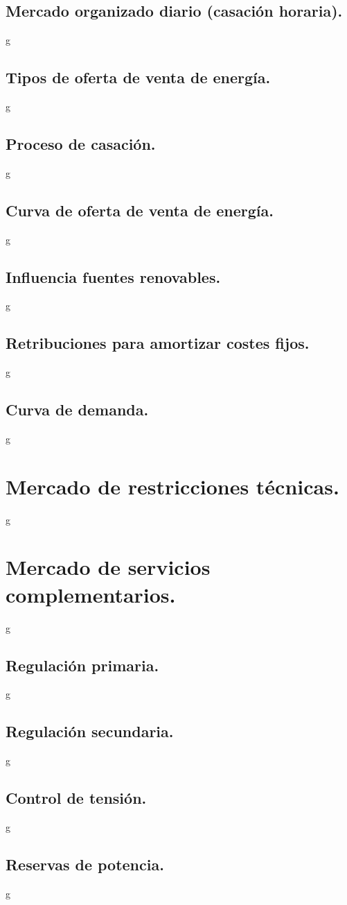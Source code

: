 \subsection{Mercado organizado diario (casación horaria).}
g
\subsection{Tipos de oferta de venta de energía.}
g
\subsection{Proceso de casación.}
g
\subsection{Curva de oferta de venta de energía.}
g
\subsection{Influencia fuentes renovables.}
g
\subsection{Retribuciones para amortizar costes fijos.}
g
\subsection{Curva de demanda.}
g
\section{Mercado de restricciones técnicas.}
g
\section{Mercado de servicios complementarios.}
g
\subsection{Regulación primaria.}
g
\subsection{Regulación secundaria.}
g
\subsection{Control de tensión.}
g
\subsection{Reservas de potencia.}
g

